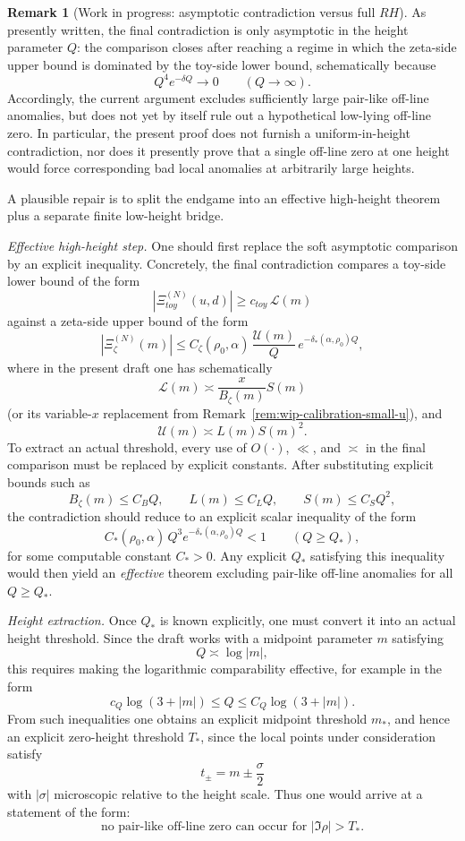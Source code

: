 \documentclass[11pt,a4paper]{amsart}
\def\RH{RH}%
\def\toy{toy}%
\theoremstyle{plain}
\theoremstyle{definition}
\newtheorem{remark}[theorem]{Remark}
\newcommand{\RH}{\mathrm{RH}}
\newcommand{\toy}{\mathrm{toy}}
\begin{document}
\begin{remark}[Work in progress: asymptotic contradiction versus full $\RH$]
\label{rem:wip-high-height-only}
As presently written, the final contradiction is only asymptotic in the height
parameter $Q$: the comparison closes after reaching a regime in which the
zeta-side upper bound is dominated by the toy-side lower bound, schematically
because
\[
Q^4 e^{-\delta Q}\to 0
\qquad (Q\to\infty).
\]
Accordingly, the current argument excludes sufficiently large pair-like
off-line anomalies, but does not yet by itself rule out a hypothetical
low-lying off-line zero.  In particular, the present proof does not furnish a
uniform-in-height contradiction, nor does it presently prove that a single
off-line zero at one height would force corresponding bad local anomalies at
arbitrarily large heights.

A plausible repair is to split the endgame into an effective high-height
theorem plus a separate finite low-height bridge.

\smallskip

\noindent
\emph{Effective high-height step.}
One should first replace the soft asymptotic comparison by an explicit
inequality.  Concretely, the final contradiction compares a toy-side lower
bound of the form
\[
|\Xi_{\toy}^{(N)}(u,d)|
\ge
c_{\toy}\,\mathcal{L}(m)
\]
against a zeta-side upper bound of the form
\[
|\Xi_{\zeta}^{(N)}(m)|
\le
C_{\zeta}(\rho_0,\alpha)\,
\frac{\mathcal{U}(m)}{Q}\,
e^{-\delta_*(\alpha,\rho_0)Q},
\]
where in the present draft one has schematically
\[
\mathcal{L}(m)\asymp \frac{x}{B_\zeta(m)}S(m)
\]
(or its variable-$x$ replacement from
Remark~\ref{rem:wip-calibration-small-u}),
and
\[
\mathcal{U}(m)\asymp L(m)S(m)^2.
\]
To extract an actual threshold, every use of $O(\cdot)$, $\ll$, and
$\asymp$ in the final comparison must be replaced by explicit constants.
After substituting explicit bounds such as
\[
B_\zeta(m)\le C_B Q,\qquad
L(m)\le C_L Q,\qquad
S(m)\le C_S Q^2,
\]
the contradiction should reduce to an explicit scalar inequality of the form
\[
C_*(\rho_0,\alpha)\,Q^3 e^{-\delta_*(\alpha,\rho_0)Q}<1
\qquad (Q\ge Q_*),
\]
for some computable constant $C_*>0$.  Any explicit $Q_*$ satisfying this
inequality would then yield an \emph{effective} theorem excluding pair-like
off-line anomalies for all $Q\ge Q_*$.

\smallskip

\noindent
\emph{Height extraction.}
Once $Q_*$ is known explicitly, one must convert it into an actual height
threshold.  Since the draft works with a midpoint parameter $m$ satisfying
\[
Q\asymp \log |m|,
\]
this requires making the logarithmic comparability effective, for example in
the form
\[
c_Q \log(3+|m|)\le Q\le C_Q \log(3+|m|).
\]
From such inequalities one obtains an explicit midpoint threshold $m_*$, and
hence an explicit zero-height threshold $T_*$, since the local points under
consideration satisfy
\[
t_\pm = m \pm \frac{\sigma}{2}
\]
with $|\sigma|$ microscopic relative to the height scale.  Thus one would
arrive at a statement of the form:
\[
\text{no pair-like off-line zero can occur for } |\Im \rho|>T_*.
\]


\end{remark}
\end{document}
